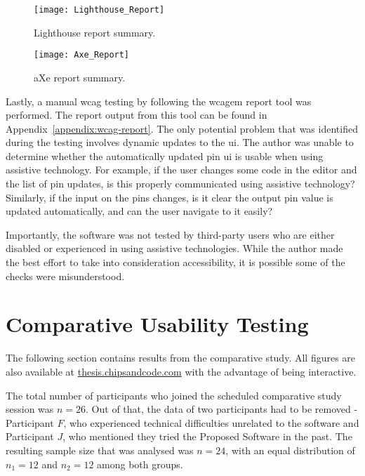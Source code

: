 \begin{figure}[H]
    \texttt{[image: Lighthouse\_Report]}
    \caption{Lighthouse report summary.}
    \label{fig:lighthouse-report}
\end{figure}

\begin{figure}[H]
    \texttt{[image: Axe\_Report]}
    \caption{aXe report summary.}
    \label{fig:axe-report}
\end{figure}

Lastly, a manual \gls{wcag} testing by following the \gls{wcagem} report tool was performed.
The report output from this tool can be found in Appendix~\ref{appendix:wcag-report}.
The only potential problem that was identified during the testing involves dynamic updates to the \gls{ui}.
The author was unable to determine whether the automatically updated pin \gls{ui} is usable when using assistive technology.
For example, if the user changes some code in the editor and the list of pin updates, is this properly communicated using assistive technology?
Similarly, if the input on the pins changes, is it clear the output pin value is updated automatically, and can the user navigate to it easily?

Importantly, the software was not tested by third-party users who are either disabled or experienced in using assistive technologies.
While the author made the best effort to take into consideration accessibility, it is possible some of the checks were misunderstood.

\section{Comparative Usability Testing}
\label{Evaluation-UX}

The following section contains results from the comparative study.
All figures are also available at \href{https://thesis.chipsandcode.com}{thesis.chipsandcode.com} with the advantage of being interactive.

The total number of participants who joined the scheduled comparative study session was $n=26$.
Out of that, the data of two participants had to be removed - Participant $F$, who experienced technical difficulties unrelated to the software and Participant $J$, who mentioned they tried the Proposed Software in the past.
The resulting sample size that was analysed was $n=24$, with an equal distribution of $n_1=12$ and $n_2=12$ among both groups.

